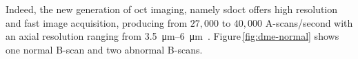 Indeed, the new generation of \ac{oct} imaging, namely \ac{sdoct} offers high resolution and fast image acquisition, producing from $27,000$ to $40,000$ A-scans/second with an axial resolution ranging from \SIrange{3.5}{6}{\micro \metre}~\cite{Chen2005}. 
Figure\,\ref{fig:dme-normal} shows one normal B-scan and two abnormal B-scans.
\begin{figure}
\begin{center}
\hspace*{\fill}
\hfill

\end{center}
\end{figure}
